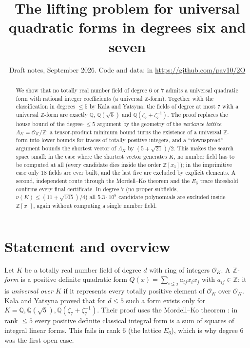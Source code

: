 \documentclass[11pt]{amsart}
\title{The lifting problem for universal quadratic forms in degrees six and seven}
\date{Draft notes, September 2026. Code and data: \file{higher-degree/} in \url{https://github.com/pav10/2O}}
\theoremstyle{definition}
\newcommand{\OK}{\mathcal{O}_K}
\newcommand{\Q}{\mathbb{Q}}
\newcommand{\Z}{\mathbb{Z}}
\newcommand{\LamK}{\Lambda_K}
\begin{document}
\begin{abstract}
We show that no totally real number field of degree $6$ or $7$ admits a universal quadratic
form with rational integer coefficients (a universal $\Z$-form).  Together with the
classification in degrees $\le 5$ by Kala and Yatsyna, the fields of degree at most $7$ with a
universal $\Z$-form are exactly $\Q$, $\Q(\sqrt5)$ and $\Q(\zeta_7+\zeta_7^{-1})$.
The proof replaces the house bound of the degree-$\le 5$ argument by the geometry of the
\emph{variance lattice} $\LamK=\OK/\Z$: a tensor-product minimum bound turns the existence of a
universal $\Z$-form into lower bounds for traces of totally positive integers, and a
``downspread'' argument bounds the shortest vector of $\LamK$ by $(5+\sqrt{21})/2$.
This makes the search space small: in the case where the shortest vector generates $K$,
no number field has to be computed at all (every candidate dies inside the order $\Z[x_1]$);
in the imprimitive case only $18$ fields are ever built, and the last five are excluded by
explicit elements.  A second, independent route through the Mordell--Ko theorem and the
$E_6$ trace threshold confirms every final certificate.  In degree $7$ (no proper subfields,
$\nu(K)\le(11+\sqrt{105})/4$) all $5.3\cdot10^8$ candidate polynomials are excluded inside
$\Z[x_1]$, again without computing a single number field.
\end{abstract}

\maketitle

\section{Statement and overview}\label{sec:intro}

Let $K$ be a totally real number field of degree $d$ with ring of integers $\OK$.  A
\emph{$\Z$-form} is a positive definite quadratic form $Q(x)=\sum_{i\le j}a_{ij}x_ix_j$ with
$a_{ij}\in\Z$; it is \emph{universal over $K$} if it represents every totally positive element
of $\OK$ over $\OK$.  Kala and Yatsyna \cite{KY-EB} proved that for $d\le5$ such a form exists
only for $K=\Q,\Q(\sqrt5),\Q(\zeta_7+\zeta_7^{-1})$.  Their proof uses the Mordell--Ko
theorem \cite{Ko}: in rank $\le5$ every positive definite classical integral form is a sum of
squares of integral linear forms.  This fails in rank $6$ (the lattice $E_6$), which is why
degree $6$ was the first open case.
\end{document}
